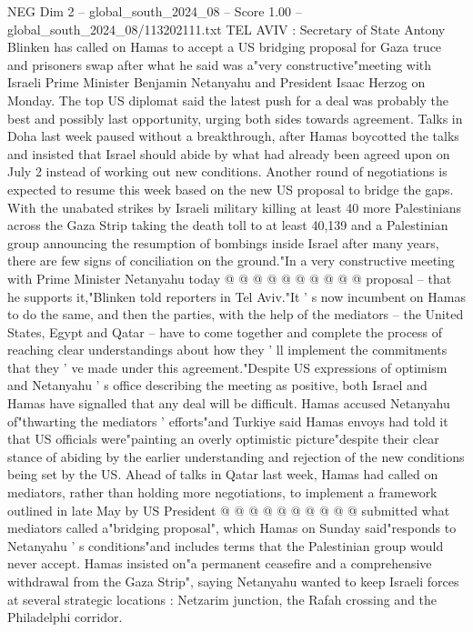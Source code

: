 \begin{textsample}{NEG Dim 2 – global\_south\_2024\_08 – Score 1.00 – global\_south\_2024\_08/113202111.txt}  \label{ex:f2_neg_112}
TEL AVIV : Secretary of State Antony Blinken has called on Hamas to accept a US bridging proposal for Gaza truce and prisoners swap after what he said was a"very constructive"meeting with Israeli Prime Minister Benjamin Netanyahu and President Isaac Herzog on Monday.
The top US diplomat said the latest push for a deal was probably the best and possibly last opportunity, urging both sides towards agreement.
Talks in Doha last week paused without a breakthrough, after Hamas boycotted the talks and insisted that Israel should abide by what had already been agreed upon on July 2 instead of working out new conditions.
Another round of negotiations is expected to resume this week based on the new US proposal to bridge the gaps.
With the unabated strikes by Israeli military killing at least 40 more Palestinians across the Gaza Strip taking the death toll to at least 40,139 and a Palestinian group announcing the resumption of bombings inside Israel after many years, there are few signs of conciliation on the ground."In a very constructive meeting with Prime Minister Netanyahu today @ @ @ @ @ @ @ @ @ @ proposal -- that he supports it,"Blinken told reporters in Tel Aviv."It ' s now incumbent on Hamas to do the same, and then the parties, with the help of the mediators -- the United States, Egypt and Qatar -- have to come together and complete the process of reaching clear understandings about how they ' ll implement the commitments that they ' ve made under this agreement."Despite US expressions of optimism and Netanyahu ' s office describing the meeting as positive, both Israel and Hamas have signalled that any deal will be difficult.
Hamas accused Netanyahu of"thwarting the mediators ' efforts"and Turkiye said Hamas envoys had told it that US officials were"painting an overly optimistic picture"despite their clear stance of abiding by the earlier understanding and rejection of the new conditions being set by the US.
Ahead of talks in Qatar last week, Hamas had called on mediators, rather than holding more negotiations, to implement a framework outlined in late May by US President @ @ @ @ @ @ @ @ @ @ submitted what mediators called a"bridging proposal", which Hamas on Sunday said"responds to Netanyahu ' s conditions"and includes terms that the Palestinian group would never accept.
Hamas insisted on"a permanent ceasefire and a comprehensive withdrawal from the Gaza Strip", saying Netanyahu wanted to keep Israeli forces at several strategic locations : Netzarim junction, the Rafah crossing and the Philadelphi corridor.

\end{textsample}
